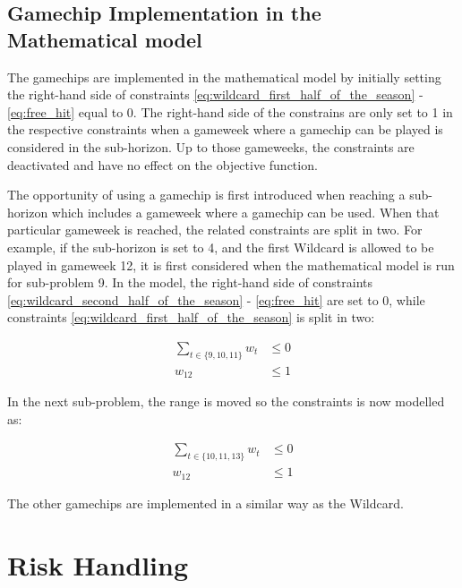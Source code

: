 \subsection{Gamechip Implementation in the Mathematical model}

The gamechips are implemented in the mathematical model by initially setting the right-hand side of constraints \ref{eq:wildcard_first_half_of_the_season} - \ref{eq:free_hit} equal to 0. The right-hand side of the constrains are only set to 1 in the respective constraints when a gameweek where a gamechip can be played is considered in the sub-horizon. Up to those gameweeks, the constraints are deactivated and have no effect on the objective function. 

\newpar


The opportunity of using a gamechip is first introduced when reaching a sub-horizon which includes a gameweek where a gamechip can be used. When that particular gameweek is reached, the related constraints are split in two. For example, if the sub-horizon is set to 4, and the first Wildcard is allowed to be played in gameweek 12, it is first considered when the mathematical model is run for sub-problem 9. In the model, the right-hand side of constraints \ref{eq:wildcard_second_half_of_the_season} - \ref{eq:free_hit} are set to 0, while constraints \ref{eq:wildcard_first_half_of_the_season} is split in two: 

\begin{equation*}
    \begin{aligned}
      \sum_{t \in \{9,10,11 \}} w_{t} & \leq 0 \\
         w_{12} & \leq 1
    \end{aligned}
\end{equation*}

In the next sub-problem, the range is moved so the constraints is now modelled as: 

\begin{equation*}
    \begin{aligned}
      \sum_{t \in \{10,11,13\}} w_{t} & \leq 0 \\
         w_{12} & \leq 1
    \end{aligned}
\end{equation*}

The other gamechips are implemented in a similar way as the Wildcard. 



\section{Risk Handling} \label{Ch.5_Variance_tradeoff}

